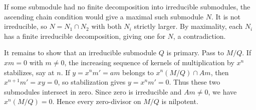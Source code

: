 If some submodule had no finite decomposition into irreducible submodules, the ascending chain condition would give a maximal such submodule $N$. It is not irreducible, so $N=N_1\cap N_2$ with both $N_i$ strictly larger. By maximality, each $N_i$ has a finite irreducible decomposition, giving one for $N$, a contradiction.

It remains to show that an irreducible submodule $Q$ is primary. Pass to $M/Q$. If $xm=0$ with $m\ne0$, the increasing sequence of kernels of multiplication by $x^n$ stabilizes, say at $n$. If $y=x^nm'=am$ belongs to $x^n(M/Q)\cap Am$, then $x^{n+1}m'=xy=0$, so stabilization gives $y=x^nm'=0$. Thus these two submodules intersect in zero. Since zero is irreducible and $Am\ne0$, we have $x^n(M/Q)=0$. Hence every zero-divisor on $M/Q$ is nilpotent.
